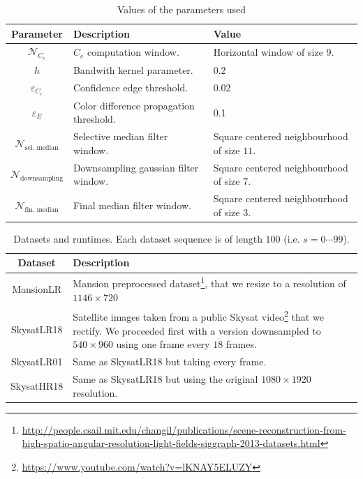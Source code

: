 \documentclass{article}
\theoremstyle{definition}
\begin{document}
\begin{table}[ht]
 \centering
 \begin{tabular}{|c|l|l|}
  \hline
  \textbf{Parameter} & \textbf{Description} & \textbf{Value}\\
  \hline \hline 
  $\mathcal{N}_{C_e}$ & $C_e$ computation window. &  Horizontal window of size $9$.\\
  \hline 
  $h$ & Bandwith kernel parameter. & 0.2 \\
  \hline 
  $\varepsilon_{C_e}$ & Confidence edge threshold. & 0.02 \\
  \hline 
  $\varepsilon_E$ & Color difference propagation threshold. & 0.1 \\
  \hline 
  $\mathcal{N}_\text{sel. median}$ & Selective median filter window. & Square centered neighbourhood of size $11$. \\
  \hline 
  $\mathcal{N}_\text{downsampling}$ & Downsampling gaussian filter window. & Square centered neighbourhood of size $7$.\\
  \hline 
  $\mathcal{N}_\text{fin. median}$ & Final median filter window. & Square centered neighbourhood of size $3$.\\
  \hline
 \end{tabular}
 \caption{Values of the parameters used}
 \label{table:parameters}
\end{table}

\begin{savenotes}
\begin{table}[ht]
 \centering
 \begin{tabular}{|c|p{10cm}|}
  \hline
  \textbf{Dataset} & \textbf{Description} \\
  \hline \hline 
  MansionLR &Mansion preprocessed dataset\footnote{\url{http://people.csail.mit.edu/changil/publications/scene-reconstruction-from-high-spatio-angular-resolution-light-fields-siggraph-2013-datasets.html}}, that we resize to a resolution of $1146\times 720$\\
  \hline 
  SkysatLR18 & Satellite images taken from a public Skysat video\footnote{\url{https://www.youtube.com/watch?v=lKNAY5ELUZY}} that we rectify. We proceeded first with a version downsampled to $540\times 960$ using one frame every $18$ frames.\\
  \hline 
  SkysatLR01 & Same as SkysatLR18 but taking every frame.\\
  \hline 
  SkysatHR18 & Same as SkysatLR18 but using the original $1080\times 1920$ resolution.\\
  \hline
 \end{tabular}
 \caption{Datasets and runtimes. Each dataset sequence is of length $100$ (i.e. $s=0\cdots 99$). }
 \label{table:datasets}
\end{table}
\end{savenotes}
\end{document}
